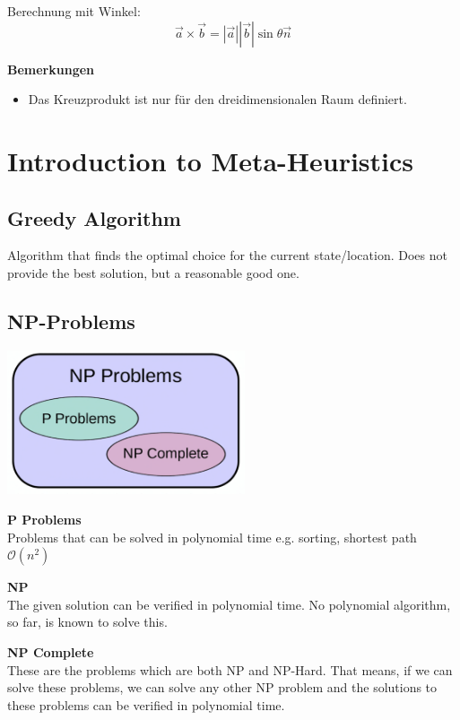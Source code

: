 \documentclass[10pt,a4paper,twocolumn]{article}
\begin{document}
Berechnung mit Winkel:
\[
\vec{a}\times\vec{b}=|\vec{a}||\vec{b}|\sin\theta\vec{n}
\]

\textbf{Bemerkungen}
\begin{itemize}
\item Das Kreuzprodukt ist nur für den dreidimensionalen Raum definiert.
\end{itemize}

\newpage
\section{Introduction to Meta-Heuristics}

\subsection{Greedy Algorithm}
Algorithm that finds the optimal choice for the current state/location. Does not provide the best solution, but a reasonable good one.

\subsection{NP-Problems}

\begin{center}
	\includegraphics[width=7cm]{images/np-problems}
\end{center}


\textbf{P Problems}\\
Problems that can be solved in polynomial time e.g. sorting, shortest path $\mathcal{O}(n^2)$

\textbf{NP}\\
The given solution can be verified in polynomial time. No polynomial algorithm, so far, is known to solve this.

\textbf{NP Complete}\\
These are the problems which are both NP and NP-Hard. That means, if we can solve these problems, we can solve any other NP problem and the solutions to these problems can be verified in polynomial time.\\
\end{document}
